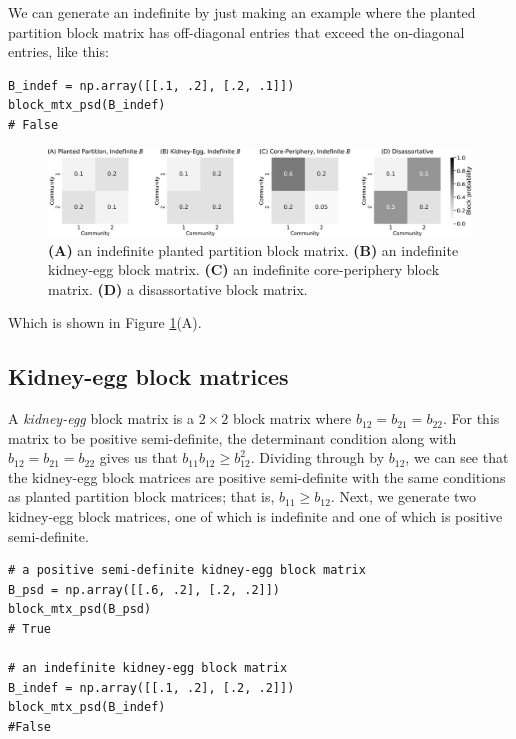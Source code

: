 We can generate an indefinite by just making an example where the planted partition block matrix has off-diagonal entries that exceed the on-diagonal entries, like this:


\begin{lstlisting}[style=python]
B_indef = np.array([[.1, .2], [.2, .1]])
block_mtx_psd(B_indef)
# False
\end{lstlisting}

\begin{figure}[h]
    \centering
    \includegraphics[width=\linewidth]{representations/ch5/Images/indef.png}
    \caption[Indefinite block matrices]{\textbf{(A)} an indefinite planted partition block matrix. \textbf{(B)} an indefinite kidney-egg block matrix. \textbf{(C)} an indefinite core-periphery block matrix. \textbf{(D)} a disassortative block matrix.}
    \label{fig:ch5:indef_bmtx}
\end{figure}

Which is shown in Figure \ref{fig:ch5:indef_bmtx}(A).

\subsection{Kidney-egg block matrices}

A \textit{kidney-egg} block matrix is a $2 \times 2$ block matrix where $b_{12} = b_{21} =  b_{22}$. For this matrix to be positive semi-definite, the determinant condition along with $b_{12} = b_{21} = b_{22}$ gives us that $b_{11}b_{12} \geq b_{12}^2$. Dividing through by $b_{12}$, we can see that the kidney-egg block matrices are positive semi-definite with the same conditions as planted partition block matrices; that is, $b_{11} \geq b_{12}$. Next, we generate two kidney-egg block matrices, one of which is indefinite and one of which is positive semi-definite. 

\begin{lstlisting}[style=python]
# a positive semi-definite kidney-egg block matrix
B_psd = np.array([[.6, .2], [.2, .2]])
block_mtx_psd(B_psd)
# True

# an indefinite kidney-egg block matrix
B_indef = np.array([[.1, .2], [.2, .2]])
block_mtx_psd(B_indef)
#False
\end{lstlisting}

